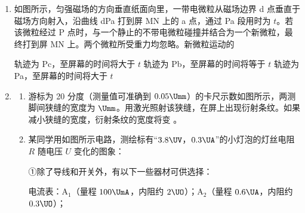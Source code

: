 \documentclass[\gkver]{gaokaozhenti}
\begin{document}
\begin{enumerate}
\item
如图所示，匀强磁场的方向垂直纸面向里，一带电微粒从磁场边界 d 点垂直于磁场方向射入，沿曲线 dPa 打到屏 MN 上的 a 点，通过 Pa 段用时为 $t$。若该微粒经过 P 点时，与一个静止的不带电微粒碰撞并结合为一个新微粒，最终打到屏 MN 上。两个微粒所受重力均忽略。新微粒运动的


{轨迹为 Pc，至屏幕的时间将大于 $t$}
{轨迹为 Pb，至屏幕的时间将等于 $t$}
{轨迹为 Pa，至屏幕的时间将大于 $t$}


\item
\begin{enumerate}
	\item
	游标为 20 分度（测量值可准确到 $0.05\Umm$）的卡尺示数如图所示，两测脚间狭缝的宽度为  $\Umm$。用激光照射该狭缝，在屏上出现衍射条纹。如果减小狭缝的宽度，衍射条纹的宽度将变 。


	\item
	某同学用如图所示电路，测绘标有“$3.8\UV$，$0.3\UA$”的小灯泡的灯丝电阻 $R$ 随电压 $U$ 变化的图象：

	\onepicture[align=right, w=4.22cm]{}

	①除了导线和开关外，有以下一些器材可供选择：

	电流表：A$_{1}$（量程 $100\UmA$，内阻约 $2\UO$）；A$_{2}$（量程 $0.6\UA$，内阻约 $0.3\UO$）；


\end{enumerate}
\end{enumerate}
\end{document}
